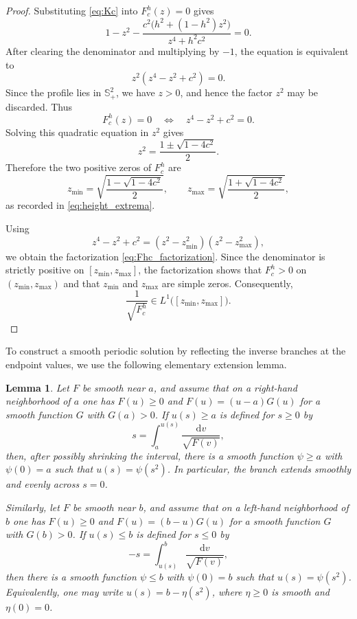 \documentclass[a4paper,11pt]{amsart}
\numberwithin{equation}{section}
\theoremstyle{plain}
\newtheorem{lem}[thm]{Lemma}
\newcommand{\dif}{\mathrm{d}}
\begin{document}
\begin{proof}
Substituting \eqref{eq:Kc} into $F_{c}^{h}(z)=0$ gives
\[
1-z^2-\frac{c^2\bigl(h^2+(1-h^2)z^2\bigr)}
{z^4+h^2c^2}
=0.
\]
After clearing the denominator and multiplying by $-1$, the equation is
equivalent to
\[
z^2(z^4-z^2+c^2)=0.
\]
Since the profile lies in $\mathbb S^2_+$, we have $z>0$, and hence
the factor $z^2$ may be discarded. Thus
\[
F_{c}^{h}(z)=0
\quad\Longleftrightarrow\quad
z^4-z^2+c^2=0.
\]
Solving this quadratic equation in $z^2$ gives
\[
z^2=\frac{1\pm\sqrt{1-4c^2}}{2}.
\]
Therefore the two positive zeros of $F_{c}^{h}$ are
\[
z_{\min}
 =\sqrt{\frac{1-\sqrt{1-4c^2}}{2}},
\qquad
z_{\max}
 =\sqrt{\frac{1+\sqrt{1-4c^2}}{2}},
\]
as recorded in \eqref{eq:height_extrema}.

Using
\[
z^4-z^2+c^2=(z^2-z_{\min}^2)(z^2-z_{\max}^2),
\]
we obtain the factorization \eqref{eq:Fhc_factorization}.
Since the denominator is strictly positive on
$[z_{\min},z_{\max}]$, the factorization shows that
$F_{c}^{h}>0$ on $(z_{\min},z_{\max})$ and that
$z_{\min}$ and $z_{\max}$ are simple zeros. Consequently,
\[
\frac{1}{\sqrt{F_{c}^{h}}}\in
L^1\bigl([z_{\min},z_{\max}]\bigr).
\]
\end{proof}

To construct a smooth periodic solution by reflecting the inverse branches
at the endpoint values, we use the following elementary extension lemma.

\begin{lem}\label{lem:smooth_even_extension}
Let $F$ be smooth near $a$, and assume that on a right-hand neighborhood
of $a$ one has $F(u)\geq0$ and
$F(u)=(u-a)G(u)$ for a smooth function $G$ with $G(a)>0$. If $u(s)\geq a$ is defined for
$s\geq0$ by
\[
    s=\int_a^{u(s)}\frac{\dif v}{\sqrt{F(v)}},
\]
then, after possibly shrinking the interval, there is a smooth function
$\psi\geq a$ with $\psi(0)=a$ such that $u(s)=\psi(s^2)$. In particular, the
branch extends smoothly and evenly across $s=0$.

Similarly, let $F$ be smooth near $b$, and assume that on a left-hand
neighborhood of $b$ one has $F(u)\geq0$ and
$F(u)=(b-u)G(u)$ for a smooth function $G$ with $G(b)>0$. If $u(s)\leq b$ is defined for
$s\leq0$ by
\[
    -s=\int_{u(s)}^b\frac{\dif v}{\sqrt{F(v)}},
\]
then there is a smooth function $\psi\leq b$ with $\psi(0)=b$ such that
$u(s)=\psi(s^2)$. Equivalently, one may write
$u(s)=b-\eta(s^2)$, where $\eta\geq 0$ is smooth and $\eta(0)=0$.
\end{lem}
\end{document}
